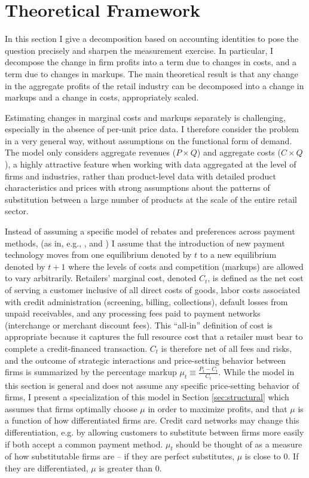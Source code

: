 \documentclass[12pt,english]{article}
\begin{document}
\section{Theoretical Framework}\label{sec:model}

In this section I give a decomposition based on accounting identities to pose the question precisely and sharpen the measurement exercise. In particular, I decompose the change in firm profits into a term due to changes in costs, and a term due to changes in markups. The main theoretical result is that any change in the aggregate profits of the retail industry can be decomposed into a change in markups and a change in costs, appropriately scaled. 

Estimating changes in marginal costs and markups separately is challenging, especially in the absence of per-unit price data. I therefore consider the problem in a very general way, without assumptions on the functional form of demand. The model only considers aggregate revenues ($P\times Q$) and aggregate costs ($C\times Q$), a highly attractive feature when working with data aggregated at the level of firms and industries, rather than product-level data with detailed product characteristics and prices with strong assumptions about the patterns of substitution between a large number of products at the scale of the entire retail sector. %

Instead of assuming a specific model of rebates and preferences across payment methods, (as in, e.g., \cite{rochet_platform_2003}, \cite{edelman_price_2015} and  \cite{wang_regulating_2023}) I assume that the introduction of new payment technology moves from one equilibrium denoted by $t$ to a new equilibrium denoted by $t+1$ where the levels of costs and competition (markups) are allowed to vary arbitrarily. Retailers' marginal cost, denoted $C_t$, is defined as the net cost of serving a customer inclusive of all direct costs of goods, labor costs associated with credit administration (screening, billing, collections), default losses from unpaid receivables, and any processing fees paid to payment networks (interchange or merchant discount fees). This ``all-in'' definition of cost is appropriate because it captures the full resource cost that a retailer must bear to complete a credit-financed transaction. $C_t$ is therefore net of all fees and risks, and the outcome of strategic interactions and price-setting behavior between firms is summarized by the percentage markup $\mu_t \equiv \frac{P_t - C_t}{C_t}$. While the model in this section is general and does not assume any specific price-setting behavior of firms, I present a specialization of this model in Section \ref{sec:structural} which assumes that firms optimally choose $\mu$ in order to maximize profits, and that $\mu$ is a function of how differentiated firms are. Credit card networks may change this differentiation, e.g. by allowing customers to substitute between firms more easily if both accept a common payment method. $\mu_t$ should be thought of as a measure of how substitutable firms are -- if they are perfect substitutes, $\mu$ is close to 0. If they are differentiated, $\mu$ is greater than 0.
\end{document}
